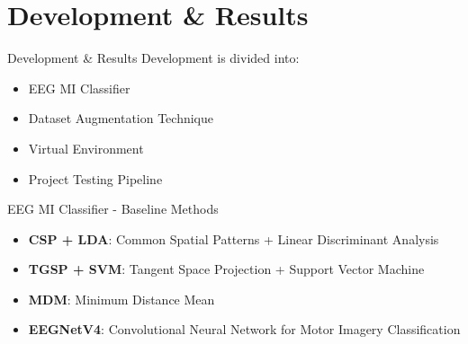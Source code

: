 \section{Development \& Results}
\begin{frame}{Development \& Results}
Development is divided into:
\begin{itemize}
    \item EEG MI Classifier
    \item Dataset Augmentation Technique
    \item Virtual Environment
    \item Project Testing Pipeline
\end{itemize}
\end{frame}

\begin{frame}{EEG MI Classifier - Baseline Methods}
\begin{itemize}
    \item \textbf{CSP + LDA}: Common Spatial Patterns + Linear Discriminant Analysis
    \item \textbf{TGSP + SVM}: Tangent Space Projection + Support Vector Machine
    \item \textbf{MDM}: Minimum Distance Mean
    \item \textbf{EEGNetV4}: Convolutional Neural Network for Motor Imagery Classification
\end{itemize}
\end{frame}
